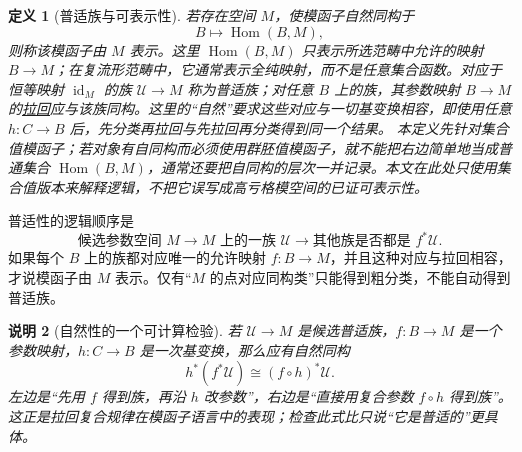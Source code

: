 \documentclass[UTF8,fontset=none,a4paper,11pt]{ctexart}
\theoremstyle{foundation-definition}
\newtheorem{definition}{定义}[section]
\theoremstyle{foundation-theorem}
\theoremstyle{foundation-proposition}
\theoremstyle{foundation-example}
\theoremstyle{foundation-remark}
\newtheorem{remark}[definition]{说明}
\theoremstyle{foundation-theorem}
\newcommand{\term}[2]{\hyperref[#1]{#2}}
\begin{document}
\begin{definition}[普适族与可表示性]\label{def:representable}
若存在空间 \(M\)，使模函子自然同构于
\[
B\longmapsto\operatorname{Hom}(B,M),
\]
则称该模函子由 \(M\) 表示。这里 \(\operatorname{Hom}(B,M)\) 只表示所选范畴中允许的映射 \(B\to M\)；在复流形范畴中，它通常表示全纯映射，而不是任意集合函数。对应于恒等映射 \(\operatorname{id}_M\) 的族 \(\mathcal U\to M\) 称为普适族；对任意 \(B\) 上的族，其参数映射 \(B\to M\) 的\term{def:pullback}{拉回}应与该族同构。这里的“自然”要求这些对应与一切基变换相容，即使用任意 \(h:C\to B\) 后，先分类再拉回与先拉回再分类得到同一个结果。
本定义先针对集合值模函子；若对象有自同构而必须使用群胚值模函子，就不能把右边简单地当成普通集合 \(\operatorname{Hom}(B,M)\)，通常还要把自同构的层次一并记录。本文在此处只使用集合值版本来解释逻辑，不把它误写成高亏格模空间的已证可表示性。
\end{definition}

普适性的逻辑顺序是
\[
\text{候选参数空间 }M
\longrightarrow
\text{\(M\) 上的一族 }\mathcal U
\longrightarrow
\text{其他族是否都是 }f^*\mathcal U.
\]
如果每个 \(B\) 上的族都对应唯一的允许映射 \(f:B\to M\)，并且这种对应与拉回相容，才说模函子由 \(M\) 表示。仅有“\(M\) 的点对应同构类”只能得到粗分类，不能自动得到普适族。

\begin{remark}[自然性的一个可计算检验]
若 \(\mathcal U\to M\) 是候选普适族，\(f:B\to M\) 是一个参数映射，\(h:C\to B\) 是一次基变换，那么应有自然同构
\[
h^*(f^*\mathcal U)\cong(f\circ h)^*\mathcal U.
\]
左边是“先用 \(f\) 得到族，再沿 \(h\) 改参数”，右边是“直接用复合参数 \(f\circ h\) 得到族”。这正是拉回复合规律在模函子语言中的表现；检查此式比只说“它是普适的”更具体。
\end{remark}
\end{document}
